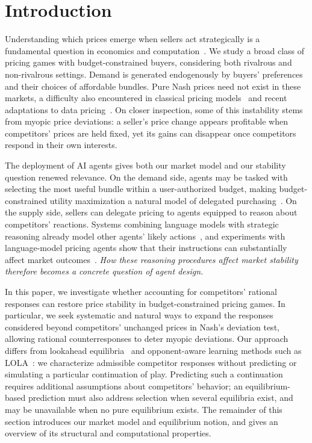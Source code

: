 \section{Introduction}
\label{sec:intro}

Understanding which prices emerge when sellers act strategically is a fundamental question in economics and computation~\cite{Tirole1988,Nisan2007,Babaioff2014}. We study a broad class of pricing games with budget-constrained buyers, considering both rivalrous and non-rivalrous settings. Demand is generated endogenously by buyers’ preferences and their choices of affordable bundles. Pure Nash prices need not exist in these markets, a difficulty also encountered in classical pricing models~\cite{dAspremontGabszewiczThisse1979,Edgeworth1897} and recent adaptations to data pricing~\cite{chaudhury2026equilibrium}. On closer inspection, some of this instability stems from myopic price deviations: a seller’s price change appears profitable when competitors’ prices are held fixed, yet its gains can disappear once competitors respond in their own interests.

The deployment of AI agents gives both our market model and our stability question renewed relevance. On the demand side, agents may be tasked with selecting the most useful bundle within a user-authorized budget, making budget-constrained utility maximization a natural model of delegated purchasing~\cite{LiuEtAl2026BudgetConstrainedAgents}. On the supply side, sellers can delegate pricing to agents equipped to reason about competitors’ reactions. Systems combining language models with strategic reasoning already model other agents’ likely actions~\cite{FAIR2022}, and experiments with language-model pricing agents show that their instructions can substantially affect market outcomes~\cite{FishGonczarowskiShorrer2024}.
\emph{How these reasoning procedures affect market stability therefore becomes a concrete question of agent design.}

In this paper, we investigate whether accounting for competitors’ rational responses can restore price stability in budget-constrained pricing games. In particular, we seek systematic and natural ways to expand the responses considered beyond competitors’ unchanged prices in Nash’s deviation test, allowing rational counterresponses to deter myopic deviations. Our approach differs from lookahead equilibria~\cite{MirrokniThainVetta2012,BiloFanelliMoscardelli2017} and opponent-aware learning methods such as LOLA~\cite{FoersterEtAl2018LOLA}: we characterize admissible competitor responses without predicting or simulating a particular continuation of play. Predicting such a continuation requires additional assumptions about competitors’ behavior; an equilibrium-based prediction must also address selection when several equilibria exist, and may be unavailable when no pure equilibrium exists. The remainder of this section introduces our market model and equilibrium notion, and gives an overview of its structural and computational properties.


